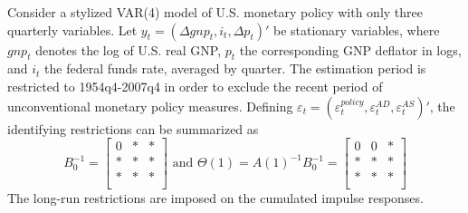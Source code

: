 Consider a stylized VAR(4) model of U.S. monetary policy with only three quarterly variables. Let $y_t = (\Delta gnp_t, i_t, \Delta p_t)'$ be stationary variables, where $gnp_t$ denotes the log of U.S. real GNP, $p_t$ the corresponding GNP deflator in logs, and $i_t$ the federal funds rate, averaged by quarter. The estimation period is restricted to 1954q4-2007q4 in order to exclude the recent period of unconventional monetary policy measures. Defining $\varepsilon_t = (\varepsilon_t^{policy}, \varepsilon_t^{AD}, \varepsilon_t^{AS})'$, the identifying restrictions can be summarized as
$$B_0^{-1}  = \begin{bmatrix}
        0 & * & * \\
        * & * & * \\
        * & * & * \\
    \end{bmatrix} \text{ and }
    \Theta(1) = A(1)^{-1} B_0^{-1} =  \begin{bmatrix}
        0 & 0 & * \\
        * & * & * \\
        * & * & * \\
    \end{bmatrix}
$$
The long-run restrictions are imposed on the cumulated impulse responses.
